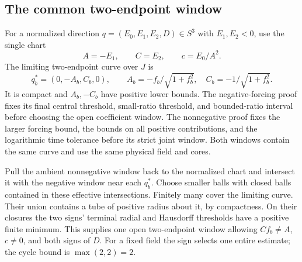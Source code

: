 \subsection{The common two-endpoint window}\label{sec:common-two-endpoint-window}
For a normalized direction $q=(E_0,E_1,E_2,D)\in S^3$ with
$E_1,E_2<0$, use the single chart
\[
 A=-E_1,\qquad C=E_2,\qquad c=E_0/A^2 .
\]
The limiting two-endpoint curve over $J$ is
\[
 q_b^*=(0,-A_b,C_b,0),\qquad
 A_b=-f_b/\sqrt{1+f_b^2},\quad
 C_b=-1/\sqrt{1+f_b^2}.
\]
It is compact and $A_b,-C_b$ have positive lower bounds.
The negative-forcing proof fixes its final central threshold,
small-ratio threshold, and bounded-ratio interval before choosing
the open coefficient window. The nonnegative proof fixes the
larger forcing bound, the bounds on all positive contributions, and the
logarithmic time tolerance before its strict joint window. Both windows
contain the same curve and use the same physical field and cores.

Pull the ambient nonnegative window back to the normalized chart
and intersect it with the negative window near each $q_b^*$.
Choose smaller balls with closed balls contained in these effective
intersections. Finitely many cover the limiting curve.
Their union contains a tube of positive radius about it, by
compactness. On their closures the two signs' terminal radial
and Hausdorff thresholds have a positive finite minimum.
This supplies one open two-endpoint window allowing
$Cf_b\ne A$, $c\ne0$, and both signs of $D$.
For a fixed field the sign selects one entire estimate;
the cycle bound is $\max(2,2)=2$.

